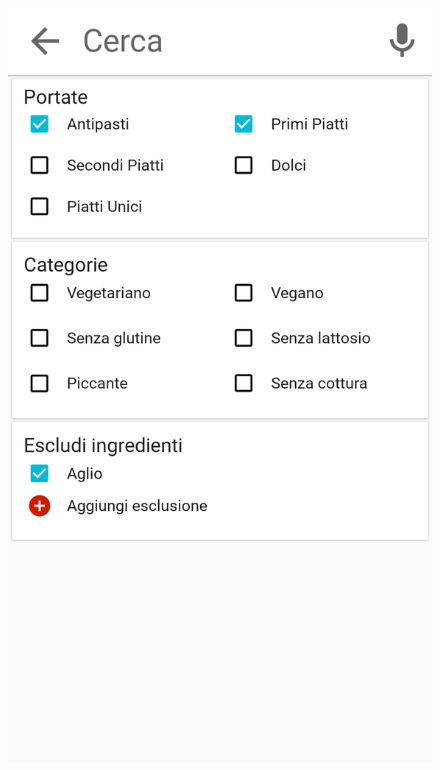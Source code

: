 \begin{figure}[H]
\begin{minipage}{.49\textwidth}
		\includegraphics[width=\textwidth]{img/wireframe/search_page.png}
	\end{minipage}
\end{figure}
